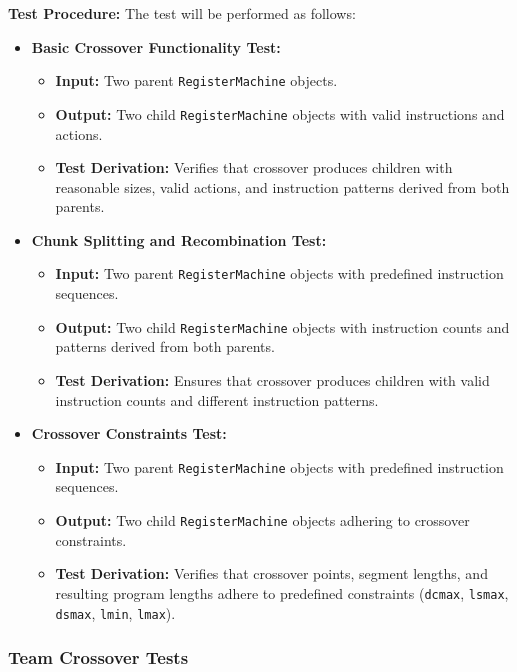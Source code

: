 \documentclass[12pt, titlepage]{article}
\begin{document}
\textbf{Test Procedure:} The test will be performed as follows:
\begin{itemize}
    \item \textbf{Basic Crossover Functionality Test:}
    \begin{itemize}
        \item \textbf{Input:} Two parent \texttt{RegisterMachine} objects.
        \item \textbf{Output:} Two child \texttt{RegisterMachine} objects with valid instructions and actions.
        \item \textbf{Test Derivation:} Verifies that crossover produces children with reasonable sizes, valid actions, and instruction patterns derived from both parents.
    \end{itemize}

    \item \textbf{Chunk Splitting and Recombination Test:}
    \begin{itemize}
        \item \textbf{Input:} Two parent \texttt{RegisterMachine} objects with predefined instruction sequences.
        \item \textbf{Output:} Two child \texttt{RegisterMachine} objects with instruction counts and patterns derived from both parents.
        \item \textbf{Test Derivation:} Ensures that crossover produces children with valid instruction counts and different instruction patterns.
    \end{itemize}

    \item \textbf{Crossover Constraints Test:}
    \begin{itemize}
        \item \textbf{Input:} Two parent \texttt{RegisterMachine} objects with predefined instruction sequences.
        \item \textbf{Output:} Two child \texttt{RegisterMachine} objects adhering to crossover constraints.
        \item \textbf{Test Derivation:} Verifies that crossover points, segment lengths, and resulting program lengths adhere to predefined constraints (\texttt{dcmax}, \texttt{lsmax}, \texttt{dsmax}, \texttt{lmin}, \texttt{lmax}).
    \end{itemize}
\end{itemize}


\subsubsection{Team Crossover Tests}
\end{document}
